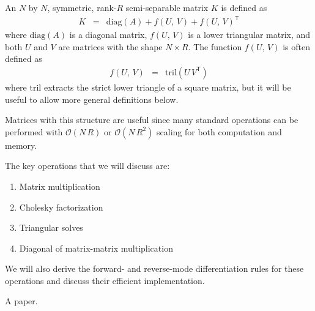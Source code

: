 \documentclass[10pt]{article}
\newcommand{\T}{^{\!\mathsf{T}\!}}
\newcommand{\tfigurerule}{\rule{0pt}{1ex}\\ \rule{\marginparwidth}{0.5pt}\\ \rule{0pt}{0.25ex}}
\newcommand{\bfigurerule}{\rule{0pt}{0.25ex}\\ \rule{\marginparwidth}{0.5pt}\\ \rule{0pt}{1ex}}
\renewcommand{\caption}[1]{\parbox{\marginparwidth}{\footnotesize\refstepcounter{figure}\textbf{\figurename~\thefigure}: {#1}}}
\begin{document}
An $N$ by $N$, symmetric, rank-$R$ semi-separable matrix $K$ is defined as
\begin{eqnarray}
  K &=& \mathrm{diag}(A) + f(U,\, V) + f(U,\, V)\T
\end{eqnarray}
where $\mathrm{diag}(A)$ is a diagonal matrix, $f(U,\, V)$ is a lower triangular matrix, and both $U$ and $V$ are matrices with the shape $N \times R$.
The function $f(U,\, V)$ is often defined as
\begin{eqnarray}
  f(U,\, V) &=& \mathrm{tril}(U \, V\T)
\end{eqnarray}
where $\mathrm{tril}$ extracts the strict lower triangle of a square matrix, but it will be useful to allow more general definitions below.

Matrices with this structure are useful since many standard operations can be performed with $\mathcal{O}(N\,R)$ or $\mathcal{O}(N\,R^2)$ scaling for both computation and memory.

The key operations that we will discuss are:

\begin{enumerate}
  \item Matrix multiplication
  \item Cholesky factorization
  \item Triangular solves
  \item Diagonal of matrix-matrix multiplication
\end{enumerate}

We will also derive the forward- and reverse-mode differentiation rules for these operations and discuss their efficient implementation.

A paper. \citep{foreman-mackey2017,foreman-mackey2018,gordon2020}

\citep{loper2020,hu2020}




\clearpage\raggedright

\end{document}
